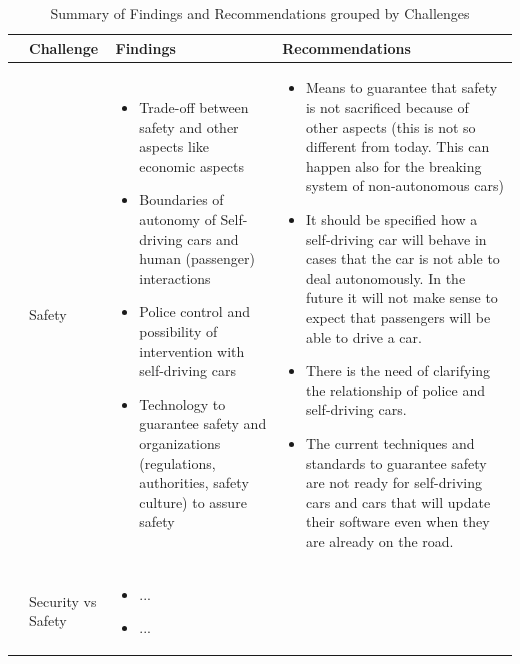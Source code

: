 \begin{table}
	\centering
	\caption{Summary of Findings and Recommendations grouped by Challenges}
	\label{tab:Findings}
	\begin{small}
		\begin{supertabular}{>{}p{.02\textwidth}|>{\raggedright}p{.105\textwidth}>{\raggedright}p{.4\textwidth}>{\raggedright}p{.4\textwidth}}
			\toprule
			 & {Challenge} & {Findings} & {Recommendations}  \tabularnewline
			\midrule
			 &Safety & 
					\begin{itemize}
					\item Trade-off between safety and other aspects like economic aspects
					\item Boundaries of autonomy of Self-driving cars and human (passenger) interactions
					\item Police control and possibility of intervention with self-driving cars
					\item Technology to guarantee safety and organizations (regulations, authorities, safety culture) to assure safety
					\end{itemize}
 			& 
					\begin{itemize}
					\item Means to guarantee that safety is not sacrificed because of other aspects (this is not so different from today. This can happen also for the breaking system of non-autonomous cars)
					\item It should be specified how a self-driving car will behave in cases that the car is not able to deal autonomously. In the future it will not make sense to expect that passengers will be able to drive a car. 
					\item There is the need of clarifying the relationship of police and self-driving cars.
					\item The current techniques and standards to guarantee safety are not ready for self-driving cars and cars that will update their software even when they are already on the road.
					\end{itemize} 			
 			 \tabularnewline {}
			& Security vs Safety & 
					\begin{itemize}
					\item ...
					\item ...
					\end{itemize}					  & 

\end{supertabular}
\end{small}
\end{table}
